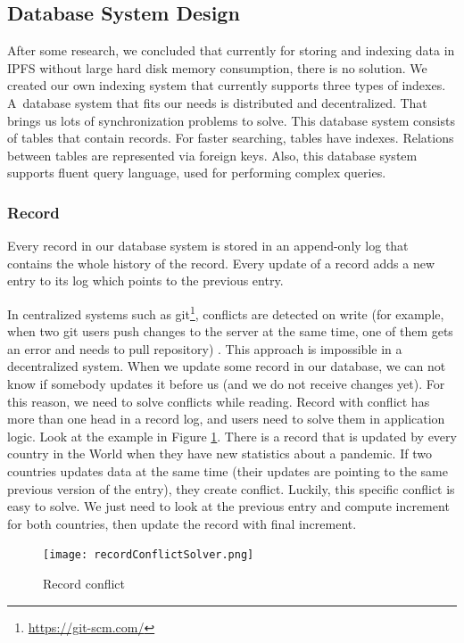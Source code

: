 \subsection{Database System Design}
After some research, we concluded that currently for storing and indexing data in IPFS without large hard disk memory consumption, there is no solution. We created our own indexing system that currently supports three types of indexes. A~database system that fits our needs is distributed and decentralized. That brings us lots of synchronization problems to solve. This database system consists of tables that contain records. For faster searching, tables have indexes. Relations between tables are represented via foreign keys. Also, this database system supports fluent query language, used for performing complex queries.

\subsubsection{Record} 
Every record in our database system is stored in an append-only log that contains the whole history of the record. Every update of a record adds a new entry to its log which points to the previous entry. 

In centralized systems such as git\footnote{\url{https://git-scm.com/}}, conflicts are detected on write (for example, when two git users push changes to the server at the same time, one of them gets an error and needs to pull repository) \cite{chacon2014pro}. This approach is impossible in a decentralized system. When we update some record in our database, we can not know if somebody updates it before us (and we do not receive changes yet). For this reason, we need to solve conflicts while reading. Record with conflict has more than one head in a record log, and users need to solve them in application logic. Look at the example in Figure \ref{recordConflict}. There is a record that is updated by every country in the World when they have new statistics about a pandemic. If two countries updates data at the same time (their updates are pointing to the same previous version of the entry), they create conflict. Luckily, this specific conflict is easy to solve. We just need to look at the previous entry and compute increment for both countries, then update the record with final increment.


\begin{figure}[h]
    \centering
    \texttt{[image: recordConflictSolver.png]}
    \caption{Record conflict}
    \label{recordConflict}
\end{figure}


